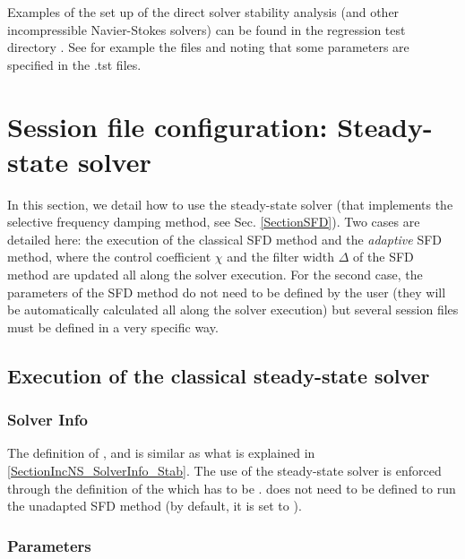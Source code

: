 \begin{notebox}
Examples of the set up of the direct solver stability analysis (and
other incompressible Navier-Stokes solvers) can be found in the
regression test directory
. See for example the files
 and 
noting that some parameters are specified in the .tst files.
\end{notebox}

\section{Session file configuration: Steady-state solver}
\label{SectionSFD_XML}

In this section, we detail how to use the steady-state solver (that
implements the selective frequency damping method, see
Sec. \ref{SectionSFD}).  Two cases are detailed here: the execution of
the classical SFD method and the \textit{adaptive} SFD method, where
the control coefficient $\chi$ and the filter width $\Delta$ of the
SFD method are updated all along the solver execution. For the second
case, the parameters of the SFD method do not need to be defined by
the user (they will be automatically calculated all along the solver
execution) but several session files must be defined in a very
specific way.

\subsection{Execution of the classical steady-state solver}

\subsubsection{Solver Info}

The definition of ,  and
 is similar as what is explained in
\ref{SectionIncNS_SolverInfo_Stab}. The use of the steady-state solver
is enforced through the definition of the  which has to be
.  does not need to be
defined to run the unadapted SFD method (by default, it is set to
).

\subsubsection{Parameters}

